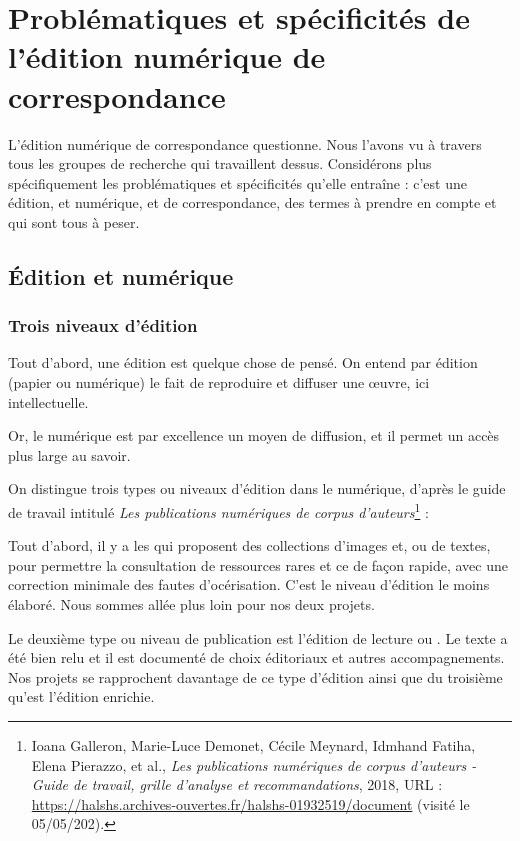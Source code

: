 \chapter{Problématiques et spécificités de l'édition numérique de correspondance}

L'édition numérique de correspondance questionne. Nous l'avons vu à travers tous les groupes de recherche qui travaillent dessus.
Considérons plus spécifiquement les problématiques et spécificités qu'elle entraîne : c'est une édition, et numérique, et de correspondance, des termes à prendre en compte et qui sont tous à peser.

\section{Édition et numérique}

\subsection{Trois niveaux d’édition}

Tout d'abord, une édition est quelque chose de pensé. On entend par édition (papier ou numérique) le fait de reproduire et diffuser une \oe uvre, ici intellectuelle. 

Or, le numérique est par excellence un moyen de diffusion, et il permet un accès plus large au savoir.

On distingue trois types ou niveaux d'édition dans le numérique, d'après le guide de travail intitulé \emph{Les publications numériques de corpus d’auteurs}\footnote{Ioana Galleron, Marie-Luce Demonet, Cécile Meynard, Idmhand Fatiha, Elena Pierazzo, et al., \emph{Les publications numériques de corpus d’auteurs - Guide de travail, grille d’analyse et recommandations}, 2018, URL : \url{https://halshs.archives-ouvertes.fr/halshs-01932519/document} (visité le 05/05/202).} : 

Tout d'abord, il y a les  qui proposent des collections d'images et, ou de textes, pour permettre la consultation de ressources rares et ce de façon rapide, avec une correction minimale des fautes d'océrisation. C'est le niveau d'édition le moins élaboré. Nous sommes allée plus loin pour nos deux projets.

Le deuxième type ou niveau de publication est l'édition de lecture ou . Le texte a été bien relu et il est documenté de choix éditoriaux et autres accompagnements. Nos projets se rapprochent davantage de ce type d'édition ainsi que du troisième qu'est l'édition enrichie.

